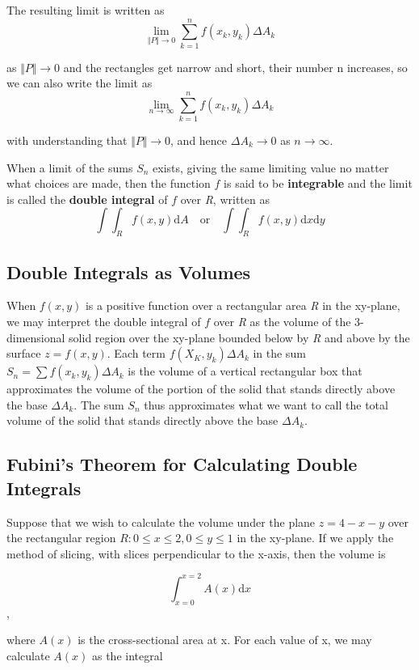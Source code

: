 \documentclass[12pt,a4paper,draft]{article}
\begin{document}
The resulting limit is written as
\[\lim_{\Vert P \Vert \to 0} \sum_{k=1}^{n}f(x_k,y_k)\Delta A_k\]

as \(\Vert P \Vert  \to 0\) and the rectangles get narrow and short, their number n increases, so we can also write the limit as
\[\lim_{n \to \infty} \sum_{k=1}^{n}f(x_k,y_k)\Delta A_k\]

with understanding that  \(\Vert P \Vert  \to 0\), and hence \(\Delta A_k \to 0\) as \(n \to \infty\).

When a limit of the sums \(S_n\) exists, giving the same limiting value no matter what choices are made, then the function \(f\) is said to be \textbf{integrable} and the limit is called the \textbf{double integral} of \(f\) over \textit{R}, written as
\[\int \int_{R}^{} f(x,y) \mathrm{d}A \quad \mathrm{or} \quad \int \int_{R}^{} f(x,y) \mathrm{d}x \mathrm{d}y \]



\subsection{Double Integrals as Volumes}

When \(f(x,y)\) is a positive function over a rectangular area \textit{R} in the xy-plane, we may interpret the double integral of \(f\) over \textit{R} as the volume of the 3-dimensional solid region over the xy-plane bounded below by \textit{R}  and above by the surface \(z = f(x,y)\). Each term \(f(X_K,y_k)\Delta A_k \) in the sum  \(S_n = \sum f(x_k,y_k)\Delta A_k\) is the volume of a vertical rectangular box that approximates the volume of the portion of the solid that stands directly above the base \(\Delta A_k\). The sum \(S_n\) thus approximates what we want to call the total volume of the solid that stands directly above the base \(\Delta A_k\).  


\subsection{Fubini's Theorem for Calculating Double Integrals}

Suppose that we wish to calculate the volume under the plane \(z = 4 - x -y\) over the rectangular region \(R: 0 \leq x \leq 2, 0 \leq y \leq 1\) in the xy-plane. If we apply the method of slicing, with slices perpendicular to the x-axis, then the volume is

\[\int_{x=0}^{x=2}A(x)\mathrm{d}x\],

where \(A(x)\) is the cross-sectional area at x. For each value of x, we may calculate \(A(x)\) as the integral
\end{document}
